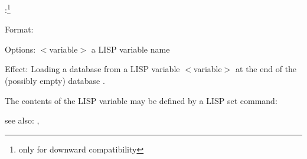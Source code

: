 \lconsult:\footnote{only for downward compatibility}

Format: 

Options: $<$variable$>$ a LISP variable name

Effect: Loading a database from a LISP variable $<$variable$>$ at the end of
	the (possibly empty) database .

	The contents of the LISP variable may be defined by a
	LISP set command:



see also: \destroy, \lreplace
